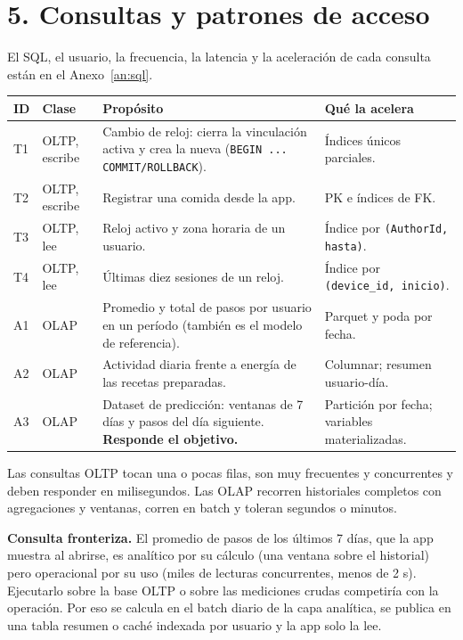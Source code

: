 \documentclass[11pt]{article}
\newcommand{\seccion}[1]{\vspace{-1.2ex}\section*{#1}\vspace{-0.6ex}}
\newcommand{\codigo}[1]{\texttt{\small #1}}
\begin{document}

\seccion{5. Consultas y patrones de acceso}

El SQL, el usuario, la frecuencia, la latencia y la aceleración de
cada consulta están en el Anexo~\ref{an:sql}.

{\small
\begin{tabularx}{\linewidth}{@{}p{0.6cm}>{\raggedright\arraybackslash}p{1.9cm}>{\raggedright\arraybackslash}X>{\raggedright\arraybackslash}p{4.3cm}@{}}
\toprule
\textbf{ID} & \textbf{Clase} & \textbf{Propósito} & \textbf{Qué la acelera}\\
\midrule
T1 & OLTP, escribe &
Cambio de reloj: cierra la vinculación activa y crea la nueva
(\codigo{BEGIN ... COMMIT/ROLLBACK}). &
Índices únicos parciales.\\
T2 & OLTP, escribe &
Registrar una comida desde la app. &
PK e índices de FK.\\
T3 & OLTP, lee &
Reloj activo y zona horaria de un usuario. &
Índice por \codigo{(AuthorId, hasta)}.\\
T4 & OLTP, lee &
Últimas diez sesiones de un reloj. &
Índice por \codigo{(device\_id, inicio)}.\\
A1 & OLAP &
Promedio y total de pasos por usuario en un período (también es el
modelo de referencia). &
Parquet y poda por fecha.\\
A2 & OLAP &
Actividad diaria frente a energía de las recetas preparadas. &
Columnar; resumen usuario-día.\\
A3 & OLAP &
Dataset de predicción: ventanas de 7 días y pasos del día siguiente.
\textbf{Responde el objetivo.} &
Partición por fecha; variables materializadas.\\
\bottomrule
\end{tabularx}
}

Las consultas OLTP tocan una o pocas filas, son muy frecuentes y
concurrentes y deben responder en milisegundos. Las OLAP recorren
historiales completos con agregaciones y ventanas, corren en batch y
toleran segundos o minutos.

\textbf{Consulta fronteriza.} El promedio de pasos de los últimos 7
días, que la app muestra al abrirse, es analítico por su cálculo
(una ventana sobre el historial) pero operacional por su uso (miles de
lecturas concurrentes, menos de 2 s). Ejecutarlo sobre la base OLTP o
sobre las mediciones crudas competiría con la operación. Por eso se
calcula en el batch diario de la capa analítica, se publica en una
tabla resumen o caché indexada por usuario y la app solo la lee.
\end{document}
